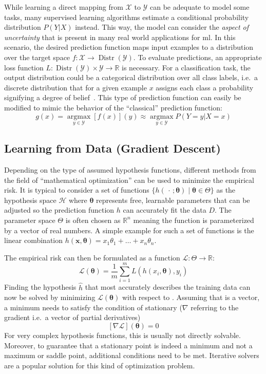 While learning a direct mapping from $\mathcal{X}$ to $\mathcal{Y}$ can be adequate to model some tasks, many supervised learning algorithms estimate a conditional probability distribution $P(Y | X)$ instead.
This way, the model can consider the \textit{aspect of uncertainty} that is present in many real world applications for \gls{ml}.
In this scenario, the desired prediction function maps input examples to a distribution over the target space $f: \mathcal{X} \rightarrow \operatorname{Distr}(\mathcal{Y})$.
To evaluate predictions, an appropriate loss function $L: \operatorname{Distr}(\mathcal{Y}) \times \mathcal{Y} \rightarrow \mathbb{R}$ is necessary.
For a classification task, the output distribution could be a categorical distribution over all class labels, i.e.\ a discrete distribution that for a given example $x$ assigns each class a probability signifying a degree of belief~\autocite{Goodfellow-et-al-2016}.
This type of prediction function can easily be modified to mimic the behavior of the \enquote{classical} prediction function:
\[
    g(x) =\underset{y \in \mathcal{Y}}{\operatorname{argmax}} [f(x)](y) \approx \underset{y \in \mathcal{Y}}{\operatorname{argmax}} P(Y=y|X=x)
\]

\subsection{Learning from Data (Gradient Descent)}\label{subsec:learning-from-data}
Depending on the type of assumed hypothesis functions, different methods from the field of \enquote{mathematical optimization} can be used to minimize the empirical risk.
It is typical to consider a set of functions $\{h(\,\cdot\, ; \boldsymbol{\theta}) \mid \boldsymbol{\theta} \in \Theta \}$ as the hypothesis space $\mathcal{H}$ where $\boldsymbol{\theta}$ represents free, learnable parameters that can be adjusted so the prediction function $h$ can accurately fit the data $D$.
The parameter space $\Theta$ is often chosen as $\mathbb{R}^n$ meaning the function is parameterized by a vector of real numbers.
A simple example for such a set of functions is the linear combination $h(\boldsymbol{x}, \boldsymbol{\theta}) = x_1\theta_1 + \dots + x_n\theta_n$.

The empirical risk can then be formulated as a function $\mathcal{L}: \Theta \rightarrow \mathbb{R}$:
\[
    \mathcal{L}(\boldsymbol{\theta}) = \frac{1}{m}\sum_{i=1}^{m} L(h(x_i, \boldsymbol{\theta}), y_i)
\]
Finding the hypothesis $\hat{h}$ that most accurately describes the training data can now be solved by minimizing $\mathcal{L}(\boldsymbol{\theta})$ with respect to \boldsymbol{\theta}.
Assuming that \boldsymbol{\theta} is a vector, a minimum needs to satisfy the condition of stationary ($\nabla$ referring to the gradient i.e.\ a vector of partial derivatives)
\[
    [\nabla\mathcal{L}](\boldsymbol{\theta}) = 0
\]
For very complex hypothesis functions, this is usually not directly solvable.
Moreover, to guarantee that a stationary point is indeed a minimum and not a maximum or saddle point, additional conditions need to be met.
Iterative solvers are a popular solution for this kind of optimization problem.

